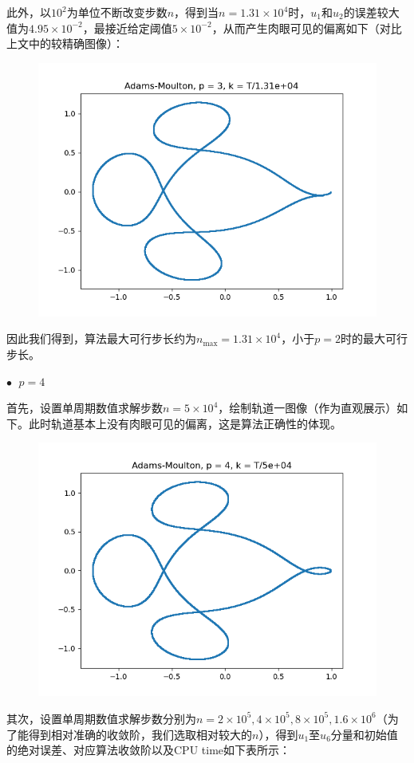 \documentclass{ctexart}
\begin{document}
\begin{sloppypar}
此外，以$10^2$为单位不断改变步数$n$，得到当$n = 1.31 \times 10^4$时，$u_1$和$u_2$的误差较大值为$4.95 \times 10^{-2}$，最接近给定阈值$5 \times 10^{-2}$，从而产生肉眼可见的偏离如下（对比上文中的较精确图像）：
\begin{figure}[H]
\centering
\includegraphics[scale = 0.45]{./report_src/Figure_12.png}
\end{figure}
因此我们得到，算法最大可行步长约为$n_{\max} = 1.31 \times 10^4$，小于$p=2$时的最大可行步长。

$\bullet \;$ $p = 4$

首先，设置单周期数值求解步数$n = 5 \times 10^4$，绘制轨道一图像（作为直观展示）如下。此时轨道基本上没有肉眼可见的偏离，这是算法正确性的体现。
\begin{figure}[H]
\centering
\includegraphics[scale = 0.45]{./report_src/Figure_13.png}
\end{figure}
其次，设置单周期数值求解步数分别为$n = 2 \times 10^5,4 \times 10^5,8 \times 10^5, 1.6 \times 10^6$（为了能得到相对准确的收敛阶，我们选取相对较大的$n$），得到$u_1$至$u_6$分量和初始值的绝对误差、对应算法收敛阶以及CPU time如下表所示：


\end{sloppypar}
\end{document}
